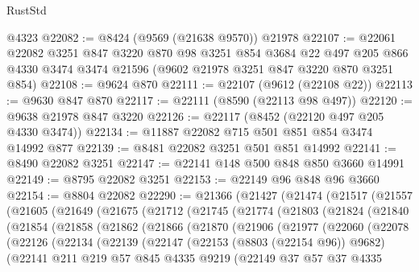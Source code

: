 \begin{lexlean}{RustStd}
\begin{coremodule}
    @4323
@22082 := @8424 (@9569 (@21638 @9570)) @21978
@22107 := @22061
    @22082
    @3251
    @847
    @3220
    @870
    @98
    @3251
    @854
    @3684
    @22
    @497
    @205
    @866
    @4330
    @3474
    @3474
    @21596
    (@9602 @21978 @3251 @847 @3220 @870 @3251 @854)
@22108 := @9624 @870
@22111 := @22107 (@9612 (@22108 @22))
@22113 := @9630 @847 @870
@22117 := @22111 (@8590 (@22113 @98 @497))
@22120 := @9638 @21978 @847 @3220
@22126 := @22117 (@8452 (@22120 @497 @205 @4330 @3474))
@22134 := @11887 @22082 @715 @501 @851 @854 @3474 @14992 @877
@22139 := @8481 @22082 @3251 @501 @851 @14992
@22141 := @8490 @22082 @3251
@22147 := @22141 @148 @500 @848 @850 @3660 @14991
@22149 := @8795 @22082 @3251
@22153 := @22149 @96 @848 @96 @3660
@22154 := @8804 @22082
@22290 := @21366
    (@21427
      (@21474
        (@21517
          (@21557
            (@21605
              (@21649
                (@21675
                  (@21712
                    (@21745
                      (@21774
                        (@21803
                          (@21824
                            (@21840
                              (@21854
                                (@21858
                                  (@21862
                                    (@21866
                                      (@21870
                                        (@21906
                                          (@21977
                                            (@22060
                                              (@22078
                                                (@22126
                                                  (@22134
                                                    (@22139
                                                      (@22147
                                                        (@22153 (@8803 (@22154 @96)) @9682)
                                                        (@22141
                                                          @211
                                                          @219
                                                          @57
                                                          @845
                                                          @4335
                                                          @9219
                                                          (@22149
                                                            @37
                                                            @57
                                                            @37
                                                            @4335

\end{coremodule}
\end{lexlean}
